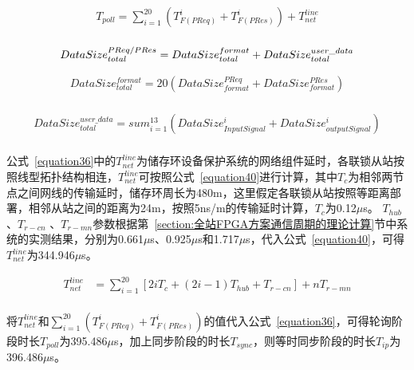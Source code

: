 \begin{equation}
\begin{split}
\label{equation36}
T_{poll}=\sum_{i=1}^{20}(T_{F(PReq)}^{i}+T_{F(PRes)}^{i})+T_{net}^{line}\\
\end{split}
\end{equation}


\begin{equation}
\label{equation37}
DataSize_{total}^{PReq/PRes} = DataSize_{total}^{format}+DataSize_{total}^{user\_data}\\
\end{equation}

\begin{equation}
\begin{split}
\label{equation38}
DataSize_{total}^{format} = 20(DataSize_{format}^{PReq}+DataSize_{format}^{PRes})\\
\end{split}
\end{equation}

\begin{equation}
\begin{split}
\label{equation39}
DataSize_{total}^{user\_data} = sum_{i=1}^{13}(DataSize_{InputSignal}^{i}+DataSize_{outputSignal}^{i})\\
\end{split}
\end{equation}

公式~\ref{equation36}中的$T_{net}^{line}$为储存环设备保护系统的网络组件延时，各联锁从站按照线型拓扑结构相连，$T_{net}^{line}$可按照公式~\ref{equation40}进行计算，其中$T_{c}$为相邻两节点之间网线的传输延时，储存环周长为480m，这里假定各联锁从站按照等距离部署，相邻从站之间的距离为24m，按照5ns/m的传输延时计算，$T_{c}$为0.12$\mu$s。 $T_{hub}$ 、$T_{r-cn}$ 、$T_{r-mn}$参数根据第~\ref{section:全站FPGA方案通信周期的理论计算}节中系统的实测结果，分别为0.661$\mu$s、0.925$\mu$s和1.717$\mu$s，代入公式~\ref{equation40}，可得$T_{net}^{line}$为344.946$\mu$s。

\begin{equation}
\begin{split}
\label{equation40}
T_{net}^{line}&=\sum_{i=1}^{20}[2iT_{c}+(2i-1)T_{hub}+T_{r-cn}]+nT_{r-mn}\\
\end{split}
\end{equation}

将$T_{net}^{line}$和$\sum_{i=1}^{20}(T_{F(PReq)}^{i}+T_{F(PRes)}^{i})$的值代入公式~\ref{equation36}，可得轮询阶段时长$T_{poll}$为395.486$\mu$s，加上同步阶段的时长$T_{sync}$，则等时同步阶段的时长$T_{ip}$为396.486$\mu$s。

